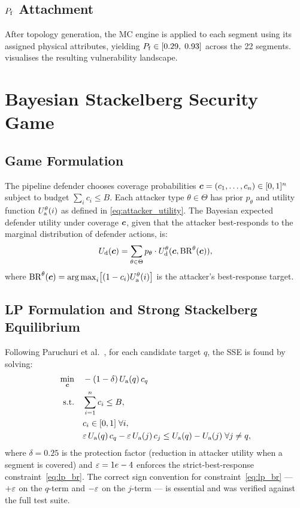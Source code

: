 \subsection{$P_{\mathrm{f}}$ Attachment}
\label{subsec:physics_pf_attach}

After topology generation, the \ac{MC} engine is applied to each
segment using its assigned physical attributes, yielding
$P_{\mathrm{f}} \in [0.29,\; 0.93]$ across the 22 segments.
 visualises the resulting vulnerability landscape.

\section{Bayesian Stackelberg Security Game}
\label{sec:physics_game}

\subsection{Game Formulation}
\label{subsec:physics_game_formulation}

The pipeline defender chooses coverage probabilities
$\bm{c} = (c_1, \ldots, c_n) \in [0,1]^n$ subject to budget
$\sum_i c_i \leq B$.  Each attacker type $\theta \in \Theta$
has prior $p_\theta$ and utility function $U_{\mathrm{a}}^\theta(i)$ as
defined in \cref{eq:attacker_utility}.  The Bayesian expected
defender utility under coverage $\bm{c}$, given that the attacker
best-responds to the marginal distribution of defender actions, is:
\begin{equation}
  U_{\mathrm{d}}(\bm{c}) = \sum_{\theta \in \Theta} p_\theta \cdot U_{\mathrm{d}}^\theta(\bm{c},
    \mathrm{BR}^\theta(\bm{c})),
  \label{eq:bayesian_defender_utility}
\end{equation}
where $\mathrm{BR}^\theta(\bm{c}) = \operatorname*{arg\,max}_i \bigl[(1 - c_i)U_{\mathrm{a}}^\theta(i)
\bigr]$ is the attacker's best-response target.

\subsection{LP Formulation and Strong Stackelberg Equilibrium}
\label{subsec:physics_lp}

Following Paruchuri et al.~\cite{Paruchuri2008}, for each candidate
target $q$, the \ac{SSE} is found by solving:
\begin{align}
  \min_{\bm{c}} \quad & -(1-\delta)\,U_{\mathrm{a}}(q)\,c_q
    \label{eq:lp_obj} \\
  \text{s.t.} \quad
    & \sum_{i=1}^n c_i \leq B, \label{eq:lp_budget} \\
    & c_i \in [0,1] \;\forall i, \label{eq:lp_bounds} \\
    & \varepsilon\,U_{\mathrm{a}}(q)\,c_q - \varepsilon\,U_{\mathrm{a}}(j)\,c_j \leq U_{\mathrm{a}}(q) - U_{\mathrm{a}}(j)
      \;\forall j \neq q, \label{eq:lp_br}
\end{align}
where $\delta = \num{0.25}$ is the protection factor (reduction in
attacker utility when a segment is covered) and $\varepsilon = 1e-4$
enforces the strict-best-response constraint~\eqref{eq:lp_br}.  The
correct sign convention for constraint~\eqref{eq:lp_br} --- $+\varepsilon$
on the $q$-term and $-\varepsilon$ on the $j$-term --- is essential and was
verified against the full test suite.

